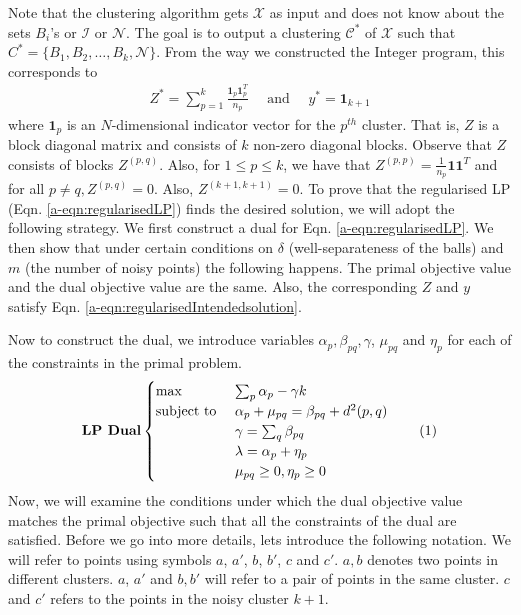 \documentclass[12pt]{article}
\newcommand{\mc}{\mathcal}
\newcommand{\mb}{\mathbf}
\newcommand\numberthis{\addtocounter{equation}{1}\tag{\theequation}}
\begin{document}
Note that the clustering algorithm gets $\mc X$ as input and does not know about the sets $B_i$'s or $\mc I$ or $\mc N$. The goal is to output a clustering $\mc C^*$ of $\mc X$ such that $C^* = \{B_1, B_2, \ldots, B_k, \mc N\}$. From the way we constructed the Integer program, this corresponds to
\begin{align}
  Z^* = \sum_{p=1}^k \frac{\mb 1_p \mb 1_{p}^T}{n_p} \enspace\enspace\text{ and }\enspace\enspace y^* = \mb 1_{k+1}\label{a-eqn:regularisedIntendedsolution}
\end{align}
where $\mb 1_p$ is an $N$-dimensional indicator vector for the $p^{th}$ cluster. That is, $Z$ is a block diagonal matrix and consists of $k$ non-zero diagonal blocks. Observe that $Z$ consists of blocks $Z^{(p, q)}$. Also, for $1\le p \le k$, we have that $Z^{(p, p)} = \frac{1}{n_p}\mb 1\mb 1^T$ and for all $p \neq q, Z^{(p, q)} = 0$. Also, $Z^{(k+1, k+1)} = 0$. To prove that the regularised LP (Eqn. \ref{a-eqn:regularisedLP}) finds the desired solution, we  will adopt the following strategy. We first construct a dual for Eqn. \ref{a-eqn:regularisedLP}. We then show that under certain conditions on $\delta$ (well-separateness of the balls) and $m$ (the number of noisy points) the following happens. The primal objective value and the dual objective value are the same. Also, the corresponding $Z$ and $y$ satisfy Eqn. \ref{a-eqn:regularisedIntendedsolution}.

Now to construct the dual, we introduce variables $\alpha_p, \beta_{pq}, \gamma$, $\mu_{pq}$ and $\eta_p$ for each of the constraints in the primal problem. 
\[\textbf{LP Dual}
    \begin{cases}
		\max \enspace & \sum_{p} \alpha_{p} -\gamma k\\
		\text{subject to } 
		&\alpha_p + \mu_{pq} = \beta_{pq} + d^2(p, q)\\
		&\gamma = \sum_q \beta_{pq}\\
		&\lambda = \alpha_p + \eta_p \\
		&\mu_{pq} \ge 0, \eta_p \ge 0
	\end{cases}
	\label{a-eqn:resularisedLPDual}
	\numberthis
\]
Now, we will examine the conditions under which the dual objective value matches the primal objective such that all the constraints of the dual are satisfied. Before we go into more details, lets introduce the following notation. We will refer to points using symbols $a$, $a'$, $b$, $b'$, $c$ and $c'$. $a, b$ denotes two points in different clusters. $a$, $a'$ and $b, b'$ will refer to a pair of points in the same cluster. $c$ and $c'$ refers to the points in the noisy cluster $k+1$. 
\end{document}
